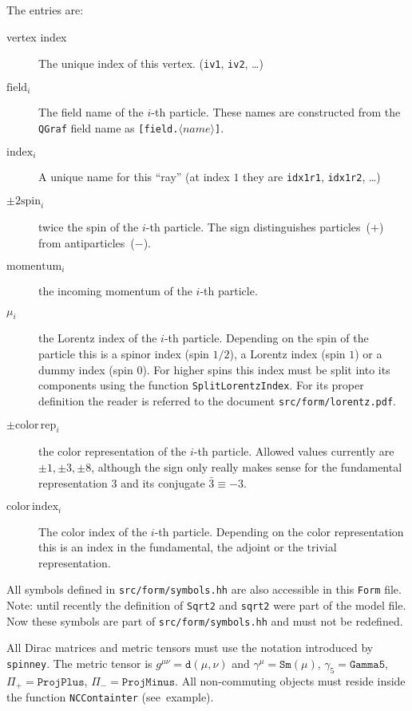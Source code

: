 \documentclass[11pt,a4paper]{refrep}
\newcommand{\qgraf}{{\tt QGraf}\xspace}
\newcommand{\form}{{\tt Form}\xspace}
\begin{document}
The entries are:
\begin{description}
\item[vertex index] The unique index of this vertex. (\texttt{iv1}, \texttt{iv2}, \dots)
\item[$\mathrm{field}_i$] The field name of the $i$-th particle. These names are constructed
from the \qgraf{} field name as \texttt{[field.$\langle name\rangle$]}.
\item[$\mathrm{index}_i$] A unique name for this ``ray'' (at index $1$ they are \texttt{idx1r1},
   \texttt{idx1r2}, \ldots)
\item[$\pm2\mathrm{spin}_i$] twice the spin of the $i$-th particle.
   The sign distinguishes particles~($+$) from antiparticles~($-$).
\item[$\mathrm{momentum}_i$] the incoming momentum of the $i$-th particle.
\item[$\mu_i$] the Lorentz index of the $i$-th particle. Depending on the spin of the particle
   this is a spinor index (spin $1/2$), a Lorentz index (spin $1$) or a dummy index (spin $0$).
   For higher spins this index must be split into its components using the function
   \texttt{SplitLorentzIndex}. For its proper definition the reader is referred to
   the document \texttt{src/form/lorentz.pdf}.
\item[$\pm\mathrm{color\,rep}_i$] the color representation of the $i$-th particle. Allowed
   values currently are $\pm1,\pm3,\pm8$, although the sign only really makes sense for the
   fundamental representation $3$ and its conjugate $\bar{3}\equiv-3$.
\item[$\mathrm{color\,index}_i$] The color index of the $i$-th particle. Depending on the color
   representation this is an index in the fundamental, the adjoint or the trivial representation.
\end{description}

All symbols defined in \texttt{src/form/symbols.hh} are also accessible in this \form{} file.
\attention Note: until recently the definition of \texttt{Sqrt2} and \texttt{sqrt2} were part
of the model file. Now these symbols are part of \texttt{src/form/symbols.hh} and must not be
redefined.

\attention All Dirac matrices and metric tensors must use the notation introduced by \texttt{spinney}.
The metric tensor is $g^{\mu\nu}=\mathtt{d}(\mu, \nu)$ and $\gamma^\mu=\mathtt{Sm}(\mu)$,
$\gamma_5=\mathtt{Gamma5}$, $\Pi_+=\mathtt{ProjPlus}$, $\Pi_-=\mathtt{ProjMinus}$. All non-commuting
objects must reside inside the function \texttt{NCContainter} (see~example).
\end{document}
